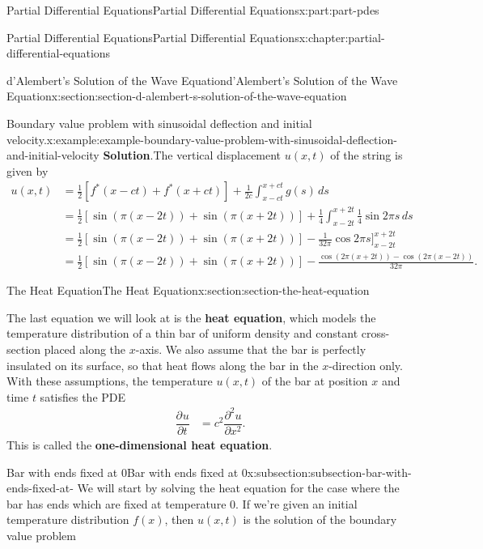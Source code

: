 \documentclass[twoside,10pt,]{book}
\newcommand{\blocktitlefont}{\relax}
\newcommand{\terminology}[1]{\textbf{#1}}
\numberwithin{equation}{part}
\providecommand{\pdv}[3][]{\dfrac{\partial^{#1} #2}{\partial #3^{#1}}}
\newcommand{\amp}{&}
\begin{document}
\begin{partptx}{Partial Differential Equations}{}{Partial Differential Equations}{}{}{x:part:part-pdes}
\begin{chapterptx}{Partial Differential Equations}{}{Partial Differential Equations}{}{}{x:chapter:partial-differential-equations}
\begin{sectionptx}{d'Alembert's Solution of the Wave Equation}{}{d'Alembert's Solution of the Wave Equation}{}{}{x:section:section-d-alembert-s-solution-of-the-wave-equation}
\begin{example}{Boundary value problem with sinusoidal deflection and initial velocity.}{x:example:example-boundary-value-problem-with-sinusoidal-deflection-and-initial-velocity}
\noindent\textbf{\blocktitlefont Solution}.\hypertarget{g:solution:idp105548818181152}{}\quad{}The vertical displacement \(u(x,t)\) of the string is given by%
%
\begin{align*}
u(x,t) \amp = \frac{1}{2}[f^{*}(x-ct)+f^{*}(x+ct)] + \frac{1}{2c}\int_{x-ct}^{x+ct}g(s)\,ds \\
\amp = \frac{1}{2}[\sin(\pi(x-2t))+\sin(\pi(x+2t))] + \frac{1}{4}\int_{x-2t}^{x+2t}\frac{1}{4}\sin2\pi s\,ds \\
\amp = \frac{1}{2}[\sin(\pi(x-2t))+\sin(\pi(x+2t))] - \frac{1}{32\pi}\cos2\pi s\Bigg]_{x-2t}^{x+2t} \\
\amp = \frac{1}{2}[\sin(\pi(x-2t))+\sin(\pi(x+2t))] - \frac{\cos(2\pi(x+2t)) - \cos(2\pi(x-2t))}{32\pi} \text{.}
\end{align*}
\end{example}
\end{sectionptx}
%
%
\typeout{************************************************}
\typeout{************************************************}
%
\begin{sectionptx}{The Heat Equation}{}{The Heat Equation}{}{}{x:section:section-the-heat-equation}
\begin{introduction}{}%
The last equation we will look at is the \terminology{heat equation}, which models the temperature distribution of a thin bar of uniform density and constant cross-section placed along the \(x\)-axis. We also assume that the bar is perfectly insulated on its surface, so that heat flows along the bar in the \(x\)-direction only. With these assumptions, the temperature \(u(x,t)\) of the bar at position \(x\) and time \(t\) satisfies the PDE%
%
\begin{align*}
\pdv{u}{t} \amp = c^{2}\pdv[2]{u}{x} \text{.}
\end{align*}
This is called the \terminology{one-dimensional heat equation}.%
\end{introduction}%
%
%
\typeout{************************************************}
\typeout{************************************************}
%
\begin{subsectionptx}{Bar with ends fixed at \(0\)}{}{Bar with ends fixed at \(0\)}{}{}{x:subsection:subsection-bar-with-ends-fixed-at-}
We will start by solving the heat equation for the case where the bar has ends which are fixed at temperature \(0\). If we're given an initial temperature distribution \(f(x)\), then \(u(x,t)\) is the solution of the boundary value problem%

\end{subsectionptx}
\end{sectionptx}
\end{chapterptx}
\end{partptx}
\end{document}
